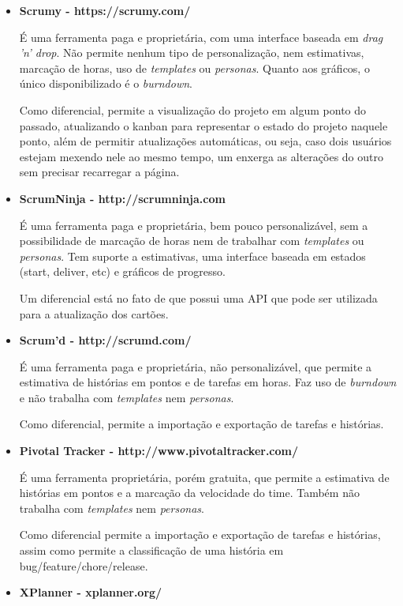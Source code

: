 \begin{itemize}
\item{\textbf{Scrumy - https://scrumy.com/}

É uma ferramenta paga e proprietária, com uma interface baseada em \textit{drag 'n' drop}. Não permite nenhum tipo de personalização, nem estimativas, marcação de horas, uso de \textit{templates} ou \textit{personas}. Quanto aos gráficos, o único disponibilizado é o \textit{burndown}. 

Como diferencial, permite a visualização do projeto em algum ponto do passado, atualizando o kanban para representar o estado do projeto naquele ponto, além de permitir atualizações automáticas, ou seja, caso dois usuários estejam mexendo nele ao mesmo tempo, um enxerga as alterações do outro sem precisar recarregar a página.}

\item{\textbf{ScrumNinja - http://scrumninja.com}

É uma ferramenta paga e proprietária, bem pouco personalizável, sem a possibilidade de marcação de horas nem de trabalhar com \textit{templates} ou \textit{personas}. Tem suporte a estimativas, uma interface baseada em estados (start, deliver, etc) e gráficos de progresso. 

Um diferencial está no fato de que possui uma API que pode ser utilizada para a atualização dos cartões.}

\item{\textbf{Scrum'd - http://scrumd.com/}

É uma ferramenta paga e proprietária, não personalizável, que permite a estimativa de histórias em pontos e de tarefas em horas. Faz uso de \textit{burndown} e não trabalha com \textit{templates} nem \textit{personas}. 

Como diferencial, permite a importação e exportação de tarefas e histórias.}

\item{\textbf{Pivotal Tracker - http://www.pivotaltracker.com/}

É uma ferramenta proprietária, porém gratuita, que permite a estimativa de histórias em pontos e a marcação da velocidade do time. Também não trabalha com \textit{templates} nem \textit{personas}. 

Como diferencial permite a importação e exportação de tarefas e histórias, assim como permite a classificação de uma história em bug/feature/chore/release.}

\item{\textbf{XPlanner - xplanner.org/}

}
\end{itemize}
